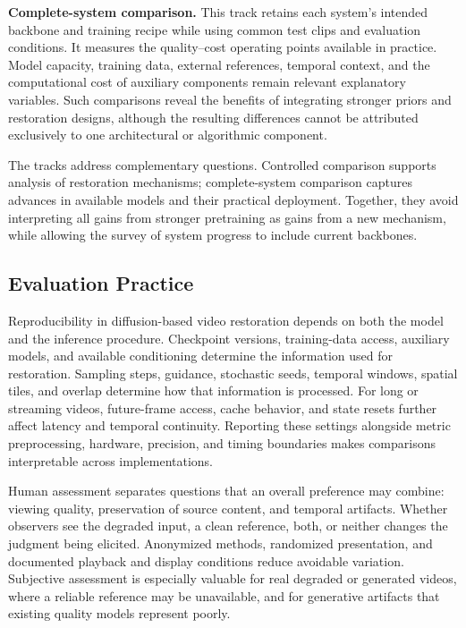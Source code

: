 \textbf{Complete-system comparison.} This track retains each system's intended backbone and training recipe while using common test clips and evaluation conditions. It measures the quality--cost operating points available in practice. Model capacity, training data, external references, temporal context, and the computational cost of auxiliary components remain relevant explanatory variables. Such comparisons reveal the benefits of integrating stronger priors and restoration designs, although the resulting differences cannot be attributed exclusively to one architectural or algorithmic component.

The tracks address complementary questions. Controlled comparison supports analysis of restoration mechanisms; complete-system comparison captures advances in available models and their practical deployment. Together, they avoid interpreting all gains from stronger pretraining as gains from a new mechanism, while allowing the survey of system progress to include current backbones.

\subsection{Evaluation Practice}
Reproducibility in diffusion-based video restoration depends on both the model and the inference procedure. Checkpoint versions, training-data access, auxiliary models, and available conditioning determine the information used for restoration. Sampling steps, guidance, stochastic seeds, temporal windows, spatial tiles, and overlap determine how that information is processed. For long or streaming videos, future-frame access, cache behavior, and state resets further affect latency and temporal continuity. Reporting these settings alongside metric preprocessing, hardware, precision, and timing boundaries makes comparisons interpretable across implementations.

Human assessment separates questions that an overall preference may combine: viewing quality, preservation of source content, and temporal artifacts. Whether observers see the degraded input, a clean reference, both, or neither changes the judgment being elicited. Anonymized methods, randomized presentation, and documented playback and display conditions reduce avoidable variation. Subjective assessment is especially valuable for real degraded or generated videos, where a reliable reference may be unavailable, and for generative artifacts that existing quality models represent poorly.

